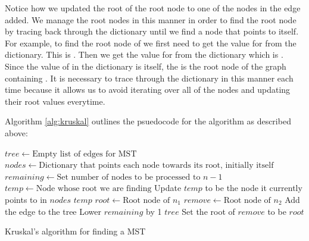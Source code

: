 \vspace{.25cm}

Notice how we updated the root of the root node to one of the nodes in the edge added.
We manage the root nodes in this manner in order to find the root node by tracing back through the dictionary until we find a node that points to itself.
For example, to find the root node of  we first need to get the value for  from the dictionary.  This is .
Then we get the value for  from the dictionary which is .
Since the value of  in the dictionary is itself, the  is the root node of the graph containing .
It is necessary to trace through the dictionary in this manner each time because it allows us to avoid iterating over all of the nodes and updating their root values everytime.


Algorithm \ref{alg:kruskal} outlines the psuedocode for the algorithm as described above:
\begin{algorithm}
\begin{algorithmic}[1]
	\State $tree \gets \text{Empty list of edges for MST}$
	\State $nodes \gets \text{Dictionary that points each node towards its root, initially itself}$
	\State $remaining \gets \text{Set number of nodes to be processed to } n-1$
		\State $temp \gets \text{Node whose root we are finding}$
			\State Update $temp$ to be the node it currently points to in $nodes$
			\State {} $temp$
		\EndWhile
	\EndFunction
		\State $root \gets \text{Root node of } n_1$
		\State $remove \gets \text{Root node of } n_2$
			\State Add the edge to the tree
			\State Lower $remaining$ by 1
				\State {} $tree$
			\EndIf
			\State Set the root of $remove$ to be $root$
		\EndIf
	\EndFor	
\EndProcedure
\end{algorithmic}
\caption{Kruskal's algorithm for finding a MST}
\label{alg:kruskal}
\end{algorithm}

